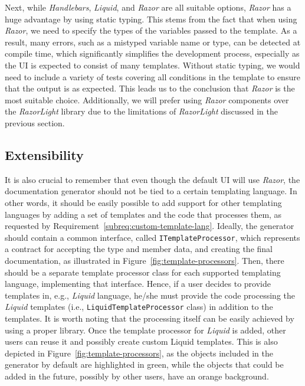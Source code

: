 Next, while \textit{Handlebars}, \textit{Liquid}, and \textit{Razor} are all suitable options, \textit{Razor} has a huge advantage by using static typing.
This stems from the fact that when using \textit{Razor}, we need to specify the types of the variables passed to the template.
As a result, many errors, such as a mistyped variable name or type, can be detected at compile time, which significantly simplifies the development process, especially as the UI is expected to consist of many templates.
Without static typing, we would need to include a variety of tests covering all conditions in the template to ensure that the output is as expected.
This leads us to the conclusion that \textit{Razor} is the most suitable choice.
Additionally, we will prefer using \textit{Razor} components over the \textit{RazorLight} library due to the limitations of \textit{RazorLight} discussed in the previous section.

\subsection*{Extensibility}

\label{sec:template-extensibility}

It is also crucial to remember that even though the default UI will use \textit{Razor}, the documentation generator should not be tied to a certain templating language.
In other words, it should be easily possible to add support for other templating languages by adding a set of templates and the code that processes them, as requested by Requirement~\ref{subreq:custom-template-lang}.
Ideally, the generator should contain a common interface, called \texttt{ITemplateProcessor}, 
which represents a contract for accepting the type and member data, and creating the final documentation, as illustrated in Figure~\ref{fig:template-processors}.
Then, there should be a separate template processor class for each supported templating language, implementing that interface.
Hence, if a user decides to provide templates in, e.g., \textit{Liquid} language, he/she must provide the code processing the \textit{Liquid} templates (i.e., \texttt{LiquidTemplateProcessor} class) in addition to the templates.
It is worth noting that the processing itself can be easily achieved by using a proper library.
Once the template processor for \textit{Liquid} is added, other users can reuse it and possibly create custom Liquid templates.
This is also depicted in Figure~\ref{fig:template-processors}, as the objects included in the generator by default are highlighted in green, while the objects that could be added in the future, possibly by other users, have an orange background. 

